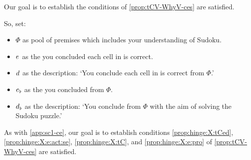 \begin{note}
\begin{scenario}
\begin{figure}[h!]
\begin{subfigure}{.45\linewidth}
        \caption*{\sudokuPuzR{}}
      \end{subfigure}
    \end{figure}
    \vspace{-\baselineskip}
  \end{scenario}
\end{note}


\begin{note}
  Our goal is to establish the conditions of \autoref{prop:tCV-WhyV-ces} are satisfied.

  So, set:
  \begin{itemize}
  \item
    \(\Phi\) as pool of premises which includes your understanding of Sudoku.
  \item
    \(e\sb{}\) as the  you concluded each cell in \sudokuPuzL{} is correct.
  \item
    \(d\sb{}\) as the description: `You conclude each cell in \sudokuPuzL{} is correct from \(\Phi\).'
  \item
    \(e\sb{\flat}\) as the  you concluded \sudokuLPV{} from \(\Phi\).
  \item
    \(d\sb{\flat}\) as the description: `You conclude \sudokuLPV{} from \(\Phi\) with the aim of solving the Sudoku puzzle.'
  \end{itemize}
\end{note}

\begin{note}
  As with \autoref{app:sc1-ce}, our goal is to establish conditions \ref{prop:hinge:X:tCed}, \ref{prop:hinge:X:e:act:se}, \ref{prop:hinge:X:tC}, and \ref{prop:hinge:X:e:pro} of \autoref{prop:tCV-WhyV-ces} are satisfied.
\end{note}

